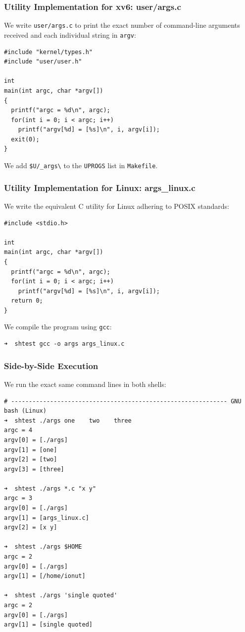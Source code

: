 \documentclass{labreport}
\begin{document}
\subsubsection{Utility Implementation for xv6: user/args.c}
We write \texttt{user/args.c} to print the exact number of command-line arguments received and each individual string in \texttt{argv}:

\begin{lstlisting}[style=c]
#include "kernel/types.h"
#include "user/user.h"

int
main(int argc, char *argv[])
{
  printf("argc = %d\n", argc);
  for(int i = 0; i < argc; i++)
    printf("argv[%d] = [%s]\n", i, argv[i]);
  exit(0);
}
\end{lstlisting}
We add \texttt{\$U/\_args\textbackslash} to the \texttt{UPROGS} list in \texttt{Makefile}.

\subsubsection{Utility Implementation for Linux: args\_linux.c}
We write the equivalent C utility for Linux adhering to POSIX standards:

\begin{lstlisting}[style=c]
#include <stdio.h>

int
main(int argc, char *argv[])
{
  printf("argc = %d\n", argc);
  for(int i = 0; i < argc; i++)
    printf("argv[%d] = [%s]\n", i, argv[i]);
  return 0;
}
\end{lstlisting}
We compile the program using \texttt{gcc}:
\begin{lstlisting}[style=bash]
➜  shtest gcc -o args args_linux.c
\end{lstlisting}

\subsubsection{Side-by-Side Execution}
We run the exact same command lines in both shells:

\begin{lstlisting}[style=bash]
# ------------------------------------------------------------- GNU bash (Linux)
➜  shtest ./args one    two    three
argc = 4
argv[0] = [./args]
argv[1] = [one]
argv[2] = [two]
argv[3] = [three]

➜  shtest ./args *.c "x y"
argc = 3
argv[0] = [./args]
argv[1] = [args_linux.c]
argv[2] = [x y]

➜  shtest ./args $HOME
argc = 2
argv[0] = [./args]
argv[1] = [/home/ionut]

➜  shtest ./args 'single quoted'
argc = 2
argv[0] = [./args]
argv[1] = [single quoted]
\end{lstlisting}
\end{document}
